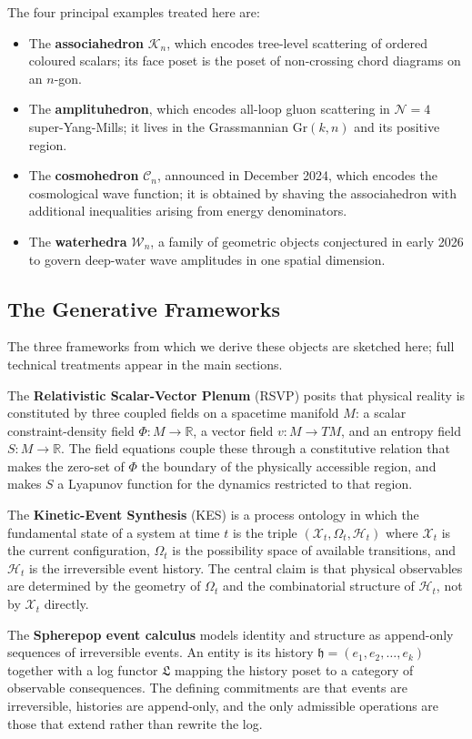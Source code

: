 \documentclass[12pt, oneside]{amsart}
\theoremstyle{plain}
\theoremstyle{definition}
\theoremstyle{remark}
\newcommand{\R}{\mathbb{R}}
\newcommand{\Gr}{\mathrm{Gr}}
\newcommand{\XKS}{\mathcal{X}}
\newcommand{\OmKS}{\Omega}
\newcommand{\HKS}{\mathcal{H}}
\newcommand{\hist}{\mathfrak{h}}
\newcommand{\Log}{\mathfrak{L}}
\newcommand{\Assoc}{\mathcal{K}_n}
\newcommand{\Cosmo}{\mathcal{C}_n}
\newcommand{\Water}{\mathcal{W}_n}
\begin{document}
The four principal examples treated here are:
\begin{itemize}[noitemsep]
  \item The \textbf{associahedron} $\Assoc$, which encodes tree-level scattering of ordered coloured scalars; its face poset is the poset of non-crossing chord diagrams on an $n$-gon.
  \item The \textbf{amplituhedron}, which encodes all-loop gluon scattering in $\mathcal{N}=4$ super-Yang-Mills; it lives in the Grassmannian $\Gr(k, n)$ and its positive region.
  \item The \textbf{cosmohedron} $\Cosmo$, announced in December 2024, which encodes the cosmological wave function; it is obtained by shaving the associahedron with additional inequalities arising from energy denominators.
  \item The \textbf{waterhedra} $\Water$, a family of geometric objects conjectured in early 2026 to govern deep-water wave amplitudes in one spatial dimension.
\end{itemize}

\subsection{The Generative Frameworks}

The three frameworks from which we derive these objects are sketched here; full technical treatments appear in the main sections.

The \textbf{Relativistic Scalar-Vector Plenum} (RSVP) posits that physical reality is constituted by three coupled fields on a spacetime manifold $M$: a scalar constraint-density field $\Phi: M \to \R$, a vector field $v: M \to TM$, and an entropy field $S: M \to \R$. The field equations couple these through a constitutive relation that makes the zero-set of $\Phi$ the boundary of the physically accessible region, and makes $S$ a Lyapunov function for the dynamics restricted to that region.

The \textbf{Kinetic-Event Synthesis} (KES) is a process ontology in which the fundamental state of a system at time $t$ is the triple $(\XKS_t, \OmKS_t, \HKS_t)$ where $\XKS_t$ is the current configuration, $\OmKS_t$ is the possibility space of available transitions, and $\HKS_t$ is the irreversible event history. The central claim is that physical observables are determined by the geometry of $\OmKS_t$ and the combinatorial structure of $\HKS_t$, not by $\XKS_t$ directly.

The \textbf{Spherepop event calculus} models identity and structure as append-only sequences of irreversible events. An entity is its history $\hist = (e_1, e_2, \ldots, e_k)$ together with a log functor $\Log$ mapping the history poset to a category of observable consequences. The defining commitments are that events are irreversible, histories are append-only, and the only admissible operations are those that extend rather than rewrite the log.
\end{document}
